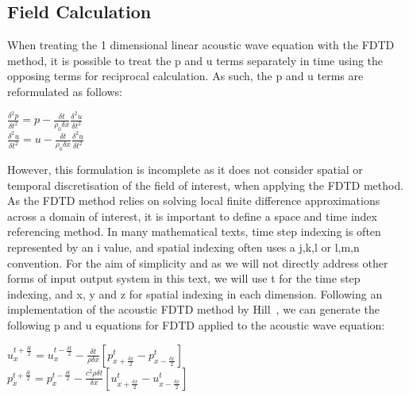 \subsection{Field Calculation}
When treating the 1 dimensional linear acoustic wave equation with the FDTD method, it is possible to treat the p and u terms separately in time using the opposing terms for reciprocal calculation. As such, the p and u terms are reformulated as follows:\\
\begin{center}
$\frac{\delta^2 p}{\delta t^2} = p - \frac{\delta t}{\rho_0 \delta x} \frac{\delta^2 u}{\delta t^{2}}$\\
$\frac{\delta^2 u}{\delta t^2} = u - \frac{\delta t}{\rho_0 \delta x} \frac{\delta^2 u}{\delta t^{2}}$\\
\end{center}
However, this formulation is incomplete as it does not consider spatial or temporal discretisation of the field of interest, when applying the FDTD method. As the FDTD method relies on solving local finite difference approximations across a domain of interest, it is important to define a space and time index referencing method. In many mathematical texts, time step indexing is often represented by an i value, and spatial indexing often uses a j,k,l or l,m,n convention. For the aim of simplicity and as we will not directly address other forms of input output system in this text, we will use t for the time step indexing, and x, y and z for spatial indexing in each dimension.
Following an implementation of the acoustic FDTD method by Hill~\cite{Hill2012}, we can generate the following p and u equations for FDTD applied to the acoustic wave equation:\\
\begin{center}
$u^{t + \frac{\delta t}{2}}_{x} = u^{t - \frac{\delta t}{2}}_{x} - \frac{\delta t}{\rho \delta x} [p^{t}_{x + \frac{\delta x}{2}} - p^{t}_{x - \frac{\delta x}{2}}]$\\
$p^{t + \frac{\delta t}{2}}_{x} = p^{t - \frac{\delta t}{2}}_{x} - \frac{c^2 \rho \delta t}{\delta x} [u^{t}_{x + \frac{\delta x}{2}} - u^{t}_{x - \frac{\delta x}{2}}]$\\
\end{center}
